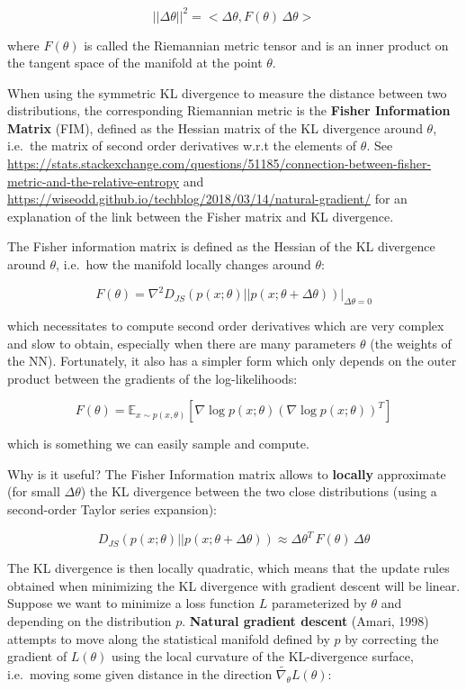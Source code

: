 \documentclass[
  letterpaper,
  DIV=11,
  numbers=noendperiod]{scrreprt}
\begin{document}
\[
    ||\Delta \theta||^2 = < \Delta \theta , F(\theta) \, \Delta \theta >
\]

where \(F(\theta)\) is called the Riemannian metric tensor and is an
inner product on the tangent space of the manifold at the point
\(\theta\).

When using the symmetric KL divergence to measure the distance between
two distributions, the corresponding Riemannian metric is the
\textbf{Fisher Information Matrix} (FIM), defined as the Hessian matrix
of the KL divergence around \(\theta\), i.e.~the matrix of second order
derivatives w.r.t the elements of \(\theta\). See
\url{https://stats.stackexchange.com/questions/51185/connection-between-fisher-metric-and-the-relative-entropy}
and
\url{https://wiseodd.github.io/techblog/2018/03/14/natural-gradient/}
for an explanation of the link between the Fisher matrix and KL
divergence.

The Fisher information matrix is defined as the Hessian of the KL
divergence around \(\theta\), i.e.~how the manifold locally changes
around \(\theta\):

\[
    F(\theta) = \nabla^2 D_{JS}(p(x; \theta) || p(x; \theta + \Delta \theta))|_{\Delta \theta = 0}
\]

which necessitates to compute second order derivatives which are very
complex and slow to obtain, especially when there are many parameters
\(\theta\) (the weights of the NN). Fortunately, it also has a simpler
form which only depends on the outer product between the gradients of
the log-likelihoods:

\[
    F(\theta) = \mathbb{E}_{x \sim p(x, \theta)}[ \nabla \log p(x; \theta)  (\nabla \log p(x; \theta))^T]
\]

which is something we can easily sample and compute.

Why is it useful? The Fisher Information matrix allows to
\textbf{locally} approximate (for small \(\Delta \theta\)) the KL
divergence between the two close distributions (using a second-order
Taylor series expansion):

\[
    D_{JS}(p(x; \theta) || p(x; \theta + \Delta \theta)) \approx \Delta \theta^T \, F(\theta) \, \Delta \theta
\]

The KL divergence is then locally quadratic, which means that the update
rules obtained when minimizing the KL divergence with gradient descent
will be linear. Suppose we want to minimize a loss function \(L\)
parameterized by \(\theta\) and depending on the distribution \(p\).
\textbf{Natural gradient descent} (Amari, 1998) attempts to move along
the statistical manifold defined by \(p\) by correcting the gradient of
\(L(\theta)\) using the local curvature of the KL-divergence surface,
i.e.~moving some given distance in the direction
\(\tilde{\nabla_\theta} L(\theta)\):
\end{document}
